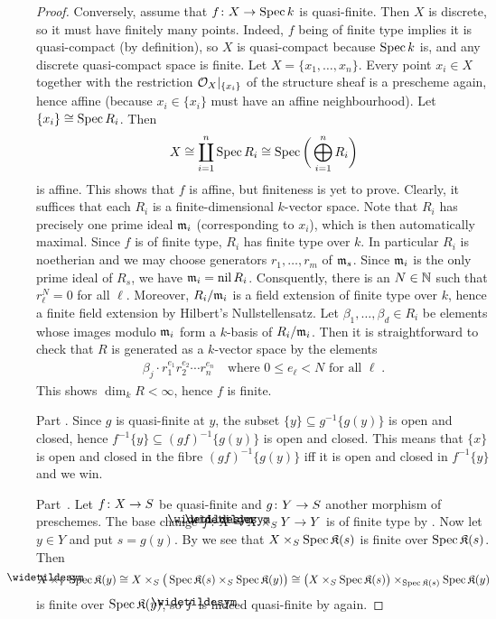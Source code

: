 \documentclass[a4paper,parskip=half,numbers=enddot, DIV=12]{scrreprt}
\renewcommand{\leq}{\leqslant}
\begin{document}
\begin{proof}
	Conversely, assume that $f\colon X\morphism\Spec k$ is quasi-finite. Then $X$ is discrete, so it must have finitely many points. Indeed, $f$ being of finite type implies it is quasi-compact (by definition), so $X$ is quasi-compact because $\operatorname{Spec} k$ is, and any discrete quasi-compact space is finite. Let $X=\{x_1,\ldots,x_n\}$. Every point $x_i\in X$ together with the restriction $\mathcal{O}_X|_{\{x_i\}}$ of the structure sheaf is a prescheme again, hence affine (because $x_i\in\{x_i\}$ must have an affine neighbourhood). Let $\{x_i\}\cong \operatorname{Spec} R_i$. Then
	\begin{align*}
		X\cong\coprod_{i=1}^n\operatorname{Spec} R_i\cong\operatorname{Spec}\bigg(\bigoplus_{i=1}^nR_i\bigg)
	\end{align*}
	is affine. This shows that $f$ is affine, but finiteness is yet to prove. Clearly, it suffices that each $R_i$ is a finite-dimensional $k$-vector space. Note that $R_i$ has precisely one prime ideal $\mathfrak{m}_i$ (corresponding to $x_i$), which is then automatically maximal. Since $f$ is of finite type, $R_i$ has finite type over $k$. In particular $R_i$ is noetherian and we may choose generators $r_1,\ldots,r_m$ of $\mathfrak{m}_s$. Since $\mathfrak{m}_i$ is the only prime ideal of $R_s$, we have $\mathfrak{m}_i=\operatorname{nil} R_i$. Consquently, there is an $N\in\mathbb{N}$ such that $r_\ell^N=0$ for all $\ell$. Moreover, $R_i/\mathfrak{m}_i$ is a field extension of finite type over $k$, hence a finite field extension by Hilbert's Nullstellensatz. Let $\beta_1,\ldots,\beta_d\in R_i$ be elements whose images modulo $\mathfrak{m}_i$ form a $k$-basis of $R_i/\mathfrak{m}_i$. Then it is straightforward to check that $R$ is generated as a $k$-vector space by the elements
	\begin{align*}
	\beta_j\cdot r_1^{e_1}r_2^{e_2}\cdots r_n^{e_n}\quad\text{where }0\leq e_\ell<N\text{ for all }\ell\;.
	\end{align*}
	This shows $\dim_kR<\infty$, hence $f$ is finite.
	
	Part . Since $g$ is quasi-finite at $y$, the subset $\{y\}\subseteq g^{-1}\{g(y)\}$ is open and closed, hence $f^{-1}\{y\}\subseteq (gf)^{-1}\{g(y)\}$ is open and closed. This means that $\{x\}$ is open and closed in the fibre $(gf)^{-1}\{g(y)\}$  iff it is open and closed in $f^{-1}\{y\}$ and we win.
	
	Part~. Let $f\colon X\morphism S$ be quasi-finite and $g\colon Y\morphism S$ another morphism of preschemes. The base change $\snake{f}\colon \snake{X}=X\times_SY\morphism Y$ is of finite type by \cite[Fact~2.2.2]{alggeo1}. Now let $y\in Y$ and put $s=g(y)$. By  we see that $X\times_S\operatorname{Spec} \mathfrak{K}(s)$ is finite over $\operatorname{Spec} \mathfrak{K}(s)$. Then
	\begin{align*}
		\snake{X}\times_Y\Spec\KK(y)\cong X\times_S\big(\Spec\KK(s)\times_S\Spec\KK(y)\big)\cong \big(X\times_S\Spec \KK(s)\big)\times_{\Spec \KK(s)}\Spec \KK(y)
	\end{align*}
	is finite over $\operatorname{Spec}\mathfrak{K}(y)$, so $\snake{f}$ is indeed quasi-finite by  again.
\end{proof}
\end{document}
